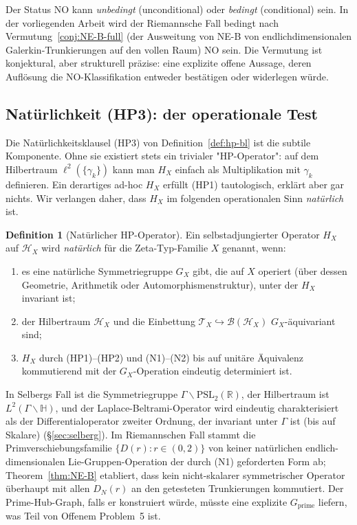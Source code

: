 \documentclass[11pt]{article}
\theoremstyle{definition}
\newtheorem{definition}[theorem]{Definition}
\theoremstyle{remark}
\newcommand{\PSL}{\mathrm{PSL}}
\begin{document}
Der Status $\mathrm{NO}$ kann \emph{unbedingt} (unconditional) oder
\emph{bedingt} (conditional) sein. In der vorliegenden Arbeit wird der Riemannsche
Fall bedingt nach Vermutung~\ref{conj:NE-B-full} (der Ausweitung von NE-B
von endlichdimensionalen Galerkin-Trunkierungen auf den vollen Raum) $\mathrm{NO}$
sein. Die Vermutung ist konjektural, aber strukturell präzise: eine explizite
offene Aussage, deren Auflösung die NO-Klassifikation entweder bestätigen
oder widerlegen würde.

\subsection{Natürlichkeit (HP3): der operationale Test}

Die Natürlichkeitsklausel (HP3) von Definition~\ref{def:hp-bl} ist die
subtile Komponente. Ohne sie existiert stets ein trivialer "HP-Operator": auf
dem Hilbertraum $\ell^2(\{\gamma_k\})$ kann man $H_X$ einfach als
Multiplikation mit $\gamma_k$ definieren. Ein derartiges ad-hoc $H_X$ erfüllt
(HP1) tautologisch, erklärt aber gar nichts. Wir verlangen daher,
dass $H_X$ im folgenden operationalen Sinn \emph{natürlich} ist.

\begin{definition}[Natürlicher HP-Operator]\label{def:natural-hp}
Ein selbstadjungierter Operator $H_X$ auf $\mathcal{H}_X$ wird
\emph{natürlich} für die Zeta-Typ-Familie $X$ genannt, wenn:
\begin{enumerate}
\item[(N1)] es eine natürliche Symmetriegruppe $G_X$ gibt, die auf $X$ operiert
  (über dessen Geometrie, Arithmetik oder Automorphismenstruktur), unter der $H_X$
  invariant ist;
\item[(N2)] der Hilbertraum $\mathcal{H}_X$ und die Einbettung
  $\mathcal{T}_X \hookrightarrow \mathcal{B}(\mathcal{H}_X)$ $G_X$-äquivariant sind;
\item[(N3)] $H_X$ durch (HP1)--(HP2) und (N1)--(N2) bis auf unitäre Äquivalenz
  kommutierend mit der $G_X$-Operation eindeutig determiniert ist.
\end{enumerate}
\end{definition}

In Selbergs Fall ist die Symmetriegruppe $\Gamma\backslash\PSL_2(\mathbb{R})$,
der Hilbertraum ist $L^2(\Gamma\backslash\mathbb{H})$, und der Laplace-Beltrami-Operator
wird eindeutig charakterisiert als der Differentialoperator zweiter Ordnung, der invariant
unter $\Gamma$ ist (bis auf Skalare) (\S\ref{sec:selberg}). Im Riemannschen Fall stammt die Primverschiebungsfamilie
$\{D(r) : r \in (0,2)\}$ von keiner natürlichen endlich-dimensionalen Lie-Gruppen-Operation
der durch (N1) geforderten Form ab; Theorem~\ref{thm:NE-B} etabliert,
dass kein nicht-skalarer symmetrischer Operator überhaupt mit allen $D_N(r)$ an
den getesteten Trunkierungen kommutiert. Der Prime-Hub-Graph, falls er konstruiert
würde, müsste eine explizite $G_{\mathrm{prime}}$ liefern, was Teil von
Offenem Problem~5 ist.
\end{document}
